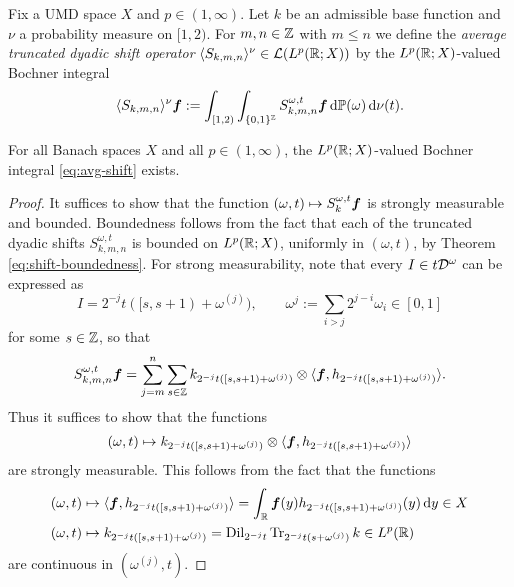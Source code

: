  \begin{defn}
   Fix a UMD space $X$ and $p \in (1,\infty)$.
   Let $k$ be an admissible base function and $\nu$ a probability measure on $[1,2)$.
   For $m,n \in \mathbb{Z}$ with $m \leq n$ we define the \emph{average truncated dyadic shift operator} $\langle S_{k,m,n} \rangle^{\nu} \in \mathcal{L}(L^p(\mathbb{R};X))$ by the $L^p(\mathbb{R};X)$-valued Bochner integral
   \begin{equation}\label{eq:avg-shift}
     \langle S_{k,m,n} \rangle^{\nu}\bm{f} := \int_{[1,2)} \int_{\{0,1\}^{\mathbb{Z}}} S_{k,m,n}^{\omega, t}\bm{f} \, \mathrm{d} \mathbb{P}(\omega) \, \mathrm{d} \nu(t).
   \end{equation}
 \end{defn}
 
\begin{lem}
  For all Banach spaces $X$ and all $p \in (1,\infty)$, the $L^p(\mathbb{R};X)$-valued Bochner integral \eqref{eq:avg-shift} exists.
\end{lem}

\begin{proof}
It suffices to show that the function $(\omega,t) \mapsto S_{k}^{\omega, t}\bm{f}$ is strongly measurable and bounded.
Boundedness follows from the fact that each of the truncated dyadic shifts $S_{k,m,n}^{\omega,t}$ is bounded on $L^p(\mathbb{R};X)$, uniformly in $(\omega,t)$, by Theorem \ref{eq:shift-boundedness}.
For strong measurability, note that every $I \in t\mathcal{D}^{\omega}$ can be expressed as
\begin{equation}\label{eq:interval-parametrisation}
  I = 2^{-j}t([s,s+1) + \omega^{(j)}), \qquad \omega^{j} := \sum_{i > j} 2^{j-i} \omega_{i} \in [0,1]
\end{equation}
for some $s \in \mathbb{Z}$, so that
\begin{equation*}
  S_{k,m,n}^{\omega, t}\bm{f} = \sum_{j = m}^{n} \sum_{s \in \mathbb{Z}} k_{2^{-j}t([s,s+1) + \omega^{(j)})} \otimes \langle \bm{f}, h_{2^{-j}t([s,s+1) + \omega^{(j)})} \rangle.
\end{equation*}
Thus it suffices to show that the functions
\begin{equation*}
  (\omega,t) \mapsto k_{2^{-j}t([s,s+1) + \omega^{(j)})} \otimes \langle \bm{f}, h_{2^{-j}t([s,s+1) + \omega^{(j)})} \rangle
\end{equation*}
are strongly measurable.
This follows from the fact that the functions
\begin{equation*}
  \begin{aligned}
    (\omega,t) &\mapsto \langle \bm{f}, h_{2^{-j}t([s,s+1) + \omega^{(j)})} \rangle = \int_{\mathbb{R}} \bm{f}(y) h_{2^{-j}t([s,s+1) + \omega^{(j)})}(y) \, \mathrm{d} y \in X\\
    (\omega,t) &\mapsto k_{2^{-j}t([s,s+1) + \omega^{(j)})} = \operatorname{Dil}_{2^{-j}t} \operatorname{Tr}_{2^{-j}t(s + \omega^{(j)})} k \in L^p(\mathbb{R})
\end{aligned}
\end{equation*}
are continuous in $(\omega^{(j)},t)$.
\end{proof}


